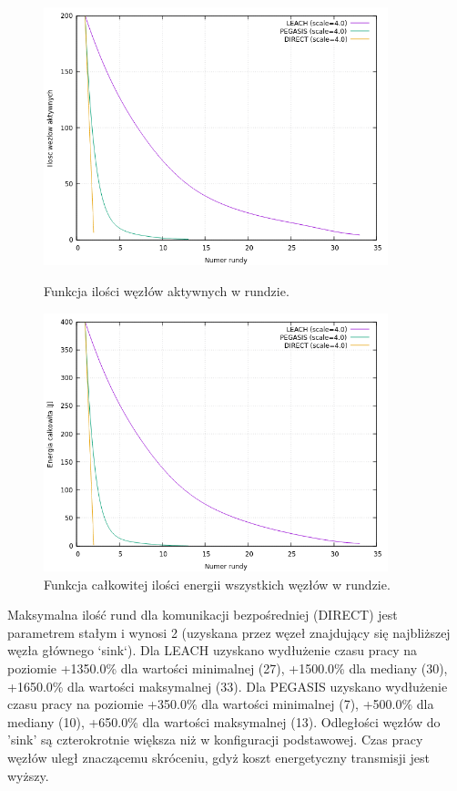 \documentclass[a4paper,12pt,twoside,openany]{report}
\begin{document}
\begin{figure}[H]
 \centering
 \includegraphics[width=10cm]{images/gnuplot/test_3/nodes_in_round_xy800.png}
 \caption{Funkcja ilości węzłów aktywnych w rundzie.}
 \includegraphics[width=10cm]{images/gnuplot/test_3/energy_in_round_xy800.png}
 \caption{Funkcja całkowitej ilości energii wszystkich węzłów w rundzie.}
\end{figure}

\par
Maksymalna ilość rund dla komunikacji bezpośredniej (DIRECT) jest parametrem stałym i wynosi 2 (uzyskana przez węzeł znajdujący się najbliższej węzła głównego `sink`).
Dla LEACH uzyskano wydłużenie czasu pracy na poziomie +1350.0\% dla wartości minimalnej (27), +1500.0\% dla mediany (30), +1650.0\% dla wartości maksymalnej (33).
Dla PEGASIS uzyskano wydłużenie czasu pracy na poziomie +350.0\% dla wartości minimalnej (7), +500.0\% dla mediany (10), +650.0\% dla wartości maksymalnej (13).
Odległości węzłów do 'sink' są czterokrotnie większa niż w konfiguracji podstawowej. Czas pracy węzłów uległ znaczącemu skróceniu, gdyż koszt energetyczny transmisji jest wyższy.
\end{document}
